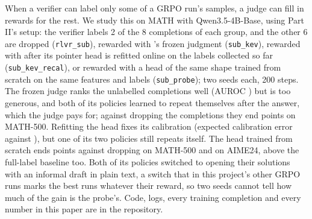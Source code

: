 When a verifier can label only some of a GRPO run's samples, a judge can fill in rewards for the rest. We study this
on MATH with Qwen3.5-4B-Base, using Part II's setup: the verifier labels 2 of the 8 completions of each group, and the
other 6 are dropped (\texttt{rlvr\_sub}), rewarded with \kev{}'s frozen judgment (\texttt{sub\_kev}), rewarded with
\kev{} after its pointer head is refitted online on the labels collected so far (\texttt{sub\_kev\_recal}), or rewarded
with a head of the same shape trained from scratch on the same features and labels (\texttt{sub\_probe}); two seeds
each, 200 steps. The frozen judge ranks the unlabelled completions well (AUROC ) but is too
generous, and both of its policies learned to repeat themselves after the answer, which the judge pays for; against dropping
the completions they end   points on MATH-500.
Refitting the head fixes its calibration (expected calibration error  against
), but one of its two policies still repeats itself. The head trained from scratch ends
  points against dropping on MATH-500 and
 on AIME24, above the full-label baseline too. Both of its policies switched to opening their
solutions with an informal draft in plain text, a switch that in this project's other GRPO runs marks the best runs
whatever their reward, so two seeds cannot tell how much of the gain is the probe's. Code, logs, every training completion and every number in
this paper are in the repository.
